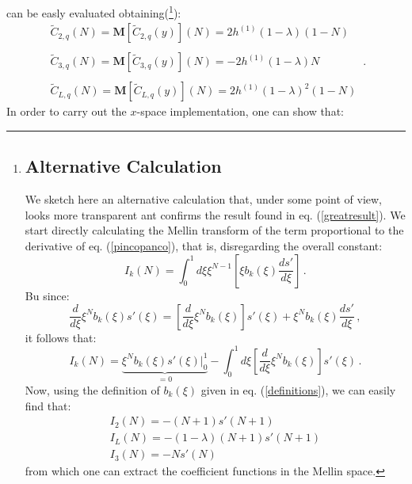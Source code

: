 \documentclass[10pt,a4paper]{article}
\begin{document}
can be easly evaluated obtaining(\footnote{
\subsection*{Alternative Calculation}
We sketch here an alternative calculation that, under some point of view, looks more transparent ant confirms the result found in eq. (\ref{greatresult}). We start directly calculating the Mellin transform of the term proportional to the derivative of eq. (\ref{pincopanco}), that is, disregarding the overall constant:
\begin{equation}
I_k(N)=\int_0^1d\xi \xi^{N-1}\left[\xi b_k(\xi)\frac{ds'}{d\xi}\right]\,.
\end{equation}
Bu since:
\begin{equation}
\frac{d}{d\xi}\xi^{N}b_k(\xi)s'(\xi)=\left[\frac{d}{d\xi}\xi^{N}b_k(\xi)\right]s'(\xi)+\xi^{N}b_k(\xi)\frac{ds'}{d\xi}\,,
\end{equation}
it follows that:
\begin{equation}
I_k(N)=\underbrace{\xi^{N}b_k(\xi)s'(\xi)\Big|_0^1}_{=0}-\int_0^1d\xi\left[\frac{d}{d\xi}\xi^{N}b_k(\xi)\right]s'(\xi)\,.
\end{equation}
Now, using the definition of $b_k(\xi)$ given in eq. (\ref{definitions}), we can easily find that:
\begin{equation}
\begin{array}{l}
\displaystyle I_2(N) = -(N+1)s'(N+1)\\
\displaystyle I_L(N) = -(1-\lambda)(N+1)s'(N+1)\\
\displaystyle I_3(N) = -Ns'(N)
\end{array}   
\end{equation}
from which one can extract the coefficient functions in the Mellin space.
}):
\begin{equation}
\begin{array}{l}
\displaystyle \widetilde{C}_{2,q}(N)=\mathbf{M}[\widetilde{C}_{2,q}(y)](N)=2h^{(1)}(1-\lambda)(1-N)\\
\\
\displaystyle \widetilde{C}_{3,q}(N)=\mathbf{M}[\widetilde{C}_{3,q}(y)](N)=-2h^{(1)}(1-\lambda)N\\
\\
\displaystyle \widetilde{C}_{L,q}(N)=\mathbf{M}[\widetilde{C}_{L,q}(y)](N)=2h^{(1)}(1-\lambda)^2(1-N)
\end{array}\,.
\label{greatresult}
\end{equation}
In order to carry out the $x$-space implementation, one can show that:
\end{document}
